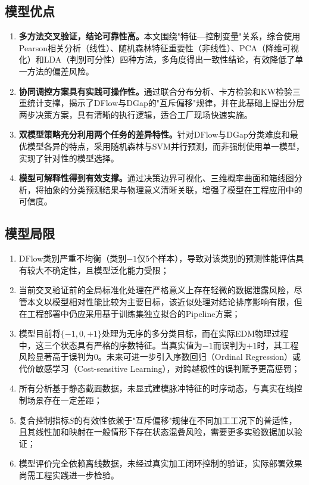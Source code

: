 \documentclass[UTF8,a4paper,12pt]{ctexart}
\begin{document}
\subsection{模型优点}

\begin{enumerate}[label=(\arabic*),leftmargin=2em]
\item \textbf{多方法交叉验证，结论可靠性高。}本文围绕"特征—控制变量"关系，综合使用Pearson相关分析（线性）、随机森林特征重要性（非线性）、PCA（降维可视化）和LDA（判别可分性）四种方法，多角度得出一致性结论，有效降低了单一方法的偏差风险。

\item \textbf{协同调控方案具有实践可操作性。}通过联合分布分析、卡方检验和KW检验三重统计支撑，揭示了DFlow与DGap的"互斥偏移"规律，并在此基础上提出分层两步决策方案，具有清晰的执行逻辑，适合工厂现场快速实施。

\item \textbf{双模型策略充分利用两个任务的差异特性。}针对DFlow与DGap分类难度和最优模型各异的特点，采用随机森林与SVM并行预测，而非强制使用单一模型，实现了针对性的模型选择。

\item \textbf{模型可解释性得到有效支撑。}通过决策边界可视化、三维概率曲面和箱线图分析，将抽象的分类预测结果与物理意义清晰关联，增强了模型在工程应用中的可信度。
\end{enumerate}

\subsection{模型局限}

\begin{enumerate}[label=(\arabic*),leftmargin=2em]
\item DFlow类别严重不均衡（类别$-1$仅5个样本），导致对该类别的预测性能评估具有较大不确定性，且模型泛化能力受限；
\item 当前交叉验证前的全局标准化处理在严格意义上存在轻微的数据泄露风险，尽管本文以模型相对性能比较为主要目标，该近似处理对结论排序影响有限，但在工程部署中仍应采用基于训练集独立拟合的Pipeline方案；
\item 模型目前将$\{-1,0,+1\}$处理为无序的多分类目标，而在实际EDM物理过程中，这三个状态具有严格的序数特征。当真实值为$-1$而误判为$+1$时，其工程风险显著高于误判为$0$。未来可进一步引入序数回归（Ordinal Regression）或代价敏感学习（Cost-sensitive Learning），对跨越极性的误判赋予更高惩罚；
\item 所有分析基于静态截面数据，未显式建模脉冲特征的时序动态，与真实在线控制场景存在一定差距；
\item 复合控制指标$S$的有效性依赖于"互斥偏移"规律在不同加工工况下的普适性，且其线性加和映射在一般情形下存在状态混叠风险，需要更多实验数据加以验证；
\item 模型评价完全依赖离线数据，未经过真实加工闭环控制的验证，实际部署效果尚需工程实践进一步检验。
\end{enumerate}
\end{document}
